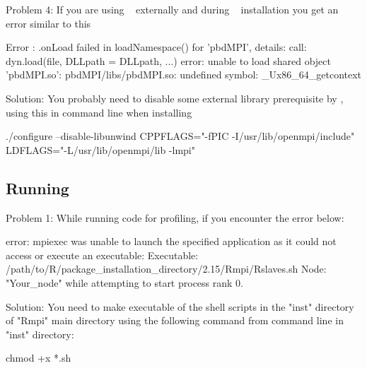 {\color{red}Problem 4:}  If you are using ~\citep{mpiP} externally
and during ~\citep{Chen2012pbdMPIpackage}
installation you get an error similar to this
\begin{Output}
Error : .onLoad failed in loadNamespace() for 'pbdMPI', details:
  call: dyn.load(file, DLLpath = DLLpath, ...)
  error: unable to load shared object 'pbdMPI.so':
  pbdMPI/libs/pbdMPI.so: undefined symbol: _Ux86_64_getcontext
\end{Output}
{\color{dkgreen}Solution:} You probably need to disable some external library
prerequisite by ,
using this in command line when installing 
\begin{Code}
./configure --disable-libunwind CPPFLAGS="-fPIC -I/usr/lib/openmpi/include" LDFLAGS="-L/usr/lib/openmpi/lib -lmpi"
\end{Code}


\subsection{Running}

{\color{red}Problem 1:}  While running  code for profiling, if you
encounter the error below:
\begin{Output}
error: mpiexec was unable to launch the specified application as it could not access
or execute an executable:
Executable: /path/to/R/package_installation_directory/2.15/Rmpi/Rslaves.sh
Node: "Your_node"
while attempting to start process rank 0.
\end{Output}
{\color{dkgreen}Solution:}  You need to make executable of the shell scripts in 
the "inst" directory of "Rmpi" main directory using the following command from 
command line in "inst" directory:
\begin{Code}
chmod +x *.sh
\end{Code}



